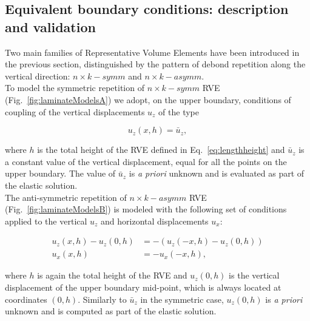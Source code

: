 \documentclass[smallextended]{svjour3}       %
\begin{document}
\subsection{Equivalent boundary conditions: description and validation}\label{subsec:bc}

Two main families of Representative Volume Elements have been introduced in the previous section, distinguished by the pattern of debond repetition along the vertical direction: $n\times k-symm$ and $n\times k-asymm$.\\
To model the symmetric repetition of $n\times k-symm$ RVE (Fig.~\ref{fig:laminateModelsA}) we adopt, on the upper boundary, conditions of coupling of the vertical displacements $u_{z}$ of the type

\begin{equation}\label{eq:symmcoupling}
u_{z}\left(x,h\right) = \bar{u}_{z},
\end{equation}

where $h$ is the total height of the RVE defined in Eq.~\ref{eq:lengthheight} and $\bar{u}_{z}$ is a constant value of the vertical displacement, equal for all the points on the upper boundary. The value of $\bar{u}_{z}$ is \emph{a priori} unknown and is evaluated as part of the elastic solution.\\
The anti-symmetric repetition of $n\times k-asymm$ RVE (Fig.~\ref{fig:laminateModelsB}) is modeled with the following set of conditions applied to the vertical $u_{z}$ and horizontal displacements $u_{x}$:

\begin{equation}\label{eq:asymmcoupling}
\begin{aligned}
u_{z}\left(x,h\right) - u_{z}\left(0,h\right) &= -\left(u_{z}\left(-x,h\right) - u_{z}\left(0,h\right)\right)\\
u_{x}\left(x,h\right) &= -u_{x}\left(-x,h\right),
\end{aligned}
\end{equation}

where $h$ is again the total height of the RVE and $u_{z}\left(0,h\right)$ is the vertical displacement of the upper boundary mid-point, which is always located at coordinates $(0,h)$. Similarly to $\bar{u}_{z}$ in the symmetric case, $u_{z}\left(0,h\right)$ is \emph{a priori} unknown and is computed as part of the elastic solution.
\end{document}
